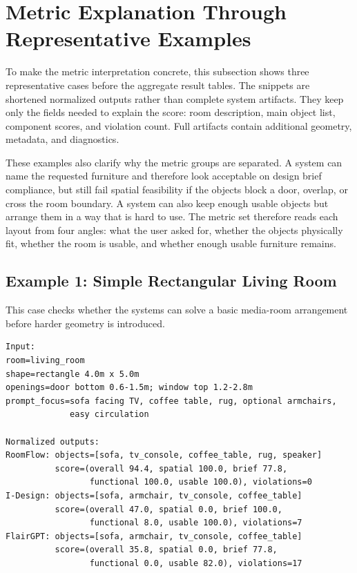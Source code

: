 \section{Metric Explanation Through Representative Examples}
\label{subsec:eval-layout-scenario-analysis}

To make the metric interpretation concrete, this subsection shows three representative cases before the aggregate result tables. The snippets are shortened normalized outputs rather than complete system artifacts. They keep only the fields needed to explain the score: room description, main object list, component scores, and violation count. Full artifacts contain additional geometry, metadata, and diagnostics.

These examples also clarify why the metric groups are separated. A system can name the requested furniture and therefore look acceptable on design brief compliance, but still fail spatial feasibility if the objects block a door, overlap, or cross the room boundary. A system can also keep enough usable objects but arrange them in a way that is hard to use. The metric set therefore reads each layout from four angles: what the user asked for, whether the objects physically fit, whether the room is usable, and whether enough usable furniture remains.

\subsection{Example 1: Simple Rectangular Living Room}
This case checks whether the systems can solve a basic media-room arrangement before harder geometry is introduced.

\begingroup
\footnotesize
\begin{verbatim}
Input:
room=living_room
shape=rectangle 4.0m x 5.0m
openings=door bottom 0.6-1.5m; window top 1.2-2.8m
prompt_focus=sofa facing TV, coffee table, rug, optional armchairs,
             easy circulation

Normalized outputs:
RoomFlow: objects=[sofa, tv_console, coffee_table, rug, speaker]
          score=(overall 94.4, spatial 100.0, brief 77.8,
                 functional 100.0, usable 100.0), violations=0
I-Design: objects=[sofa, armchair, tv_console, coffee_table]
          score=(overall 47.0, spatial 0.0, brief 100.0,
                 functional 8.0, usable 100.0), violations=7
FlairGPT: objects=[sofa, armchair, tv_console, coffee_table]
          score=(overall 35.8, spatial 0.0, brief 77.8,
                 functional 0.0, usable 82.0), violations=17
\end{verbatim}
\endgroup

